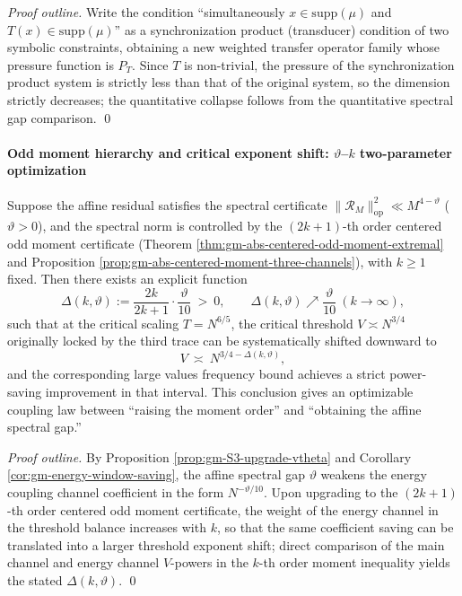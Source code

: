 \begin{proof}[Proof outline]
Write the condition ``simultaneously \(x\in\mathrm{supp}(\mu)\) and \(T(x)\in\mathrm{supp}(\mu)\)'' as a synchronization product (transducer) condition of two symbolic constraints, obtaining a new weighted transfer operator family whose pressure function is \(P_T\).
Since \(T\) is non-trivial, the pressure of the synchronization product system is strictly less than that of the original system, so the dimension strictly decreases; the quantitative collapse follows from the quantitative spectral gap comparison. \qed
\end{proof}

\paragraph{Odd moment hierarchy and critical exponent shift: \texorpdfstring{$\vartheta$}{vtheta}--\texorpdfstring{$k$}{k} two-parameter optimization}
\begin{proposition}\label{prop:gm-critical-exponent-shift-k-vtheta}
Suppose the affine residual satisfies the spectral certificate
\(
\|\mathcal{R}_M\|_{\mathrm{op}}^2\ll M^{4-\vartheta}
\) (\(\vartheta>0\)), and the spectral norm is controlled by the \((2k+1)\)-th order centered odd moment certificate (Theorem \ref{thm:gm-abs-centered-odd-moment-extremal} and Proposition \ref{prop:gm-abs-centered-moment-three-channels}), with \(k\ge 1\) fixed.
Then there exists an explicit function
\[
\Delta(k,\vartheta):=\frac{2k}{2k+1}\cdot\frac{\vartheta}{10}\ >\ 0,
\qquad
\Delta(k,\vartheta)\nearrow \frac{\vartheta}{10}\ (k\to\infty),
\]
such that at the critical scaling \(T=N^{6/5}\), the critical threshold \(V\asymp N^{3/4}\) originally locked by the third trace can be systematically shifted downward to
\[
V\ \asymp\ N^{3/4-\Delta(k,\vartheta)},
\]
and the corresponding large values frequency bound achieves a strict power-saving improvement in that interval.
This conclusion gives an optimizable coupling law between ``raising the moment order'' and ``obtaining the affine spectral gap.''
\end{proposition}

\begin{proof}[Proof outline]
By Proposition \ref{prop:gm-S3-upgrade-vtheta} and Corollary \ref{cor:gm-energy-window-saving}, the affine spectral gap \(\vartheta\) weakens the energy coupling channel coefficient in the form \(N^{-\vartheta/10}\).
Upon upgrading to the \((2k+1)\)-th order centered odd moment certificate, the weight of the energy channel in the threshold balance increases with \(k\), so that the same coefficient saving can be translated into a larger threshold exponent shift; direct comparison of the main channel and energy channel \(V\)-powers in the \(k\)-th order moment inequality yields the stated \(\Delta(k,\vartheta)\). \qed
\end{proof}

